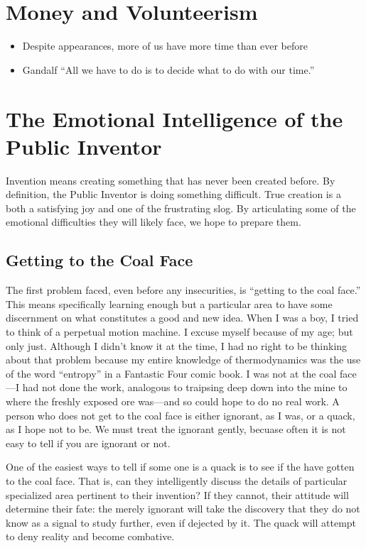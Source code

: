 \documentclass[
	fontsize=10pt, %
	twoside=false, %
	secnumdepth=1, %
]{kaobook}
\begin{document}
\chapter{Money and Volunteerism}

\begin{itemize}
\item Despite appearances, more of us have more time than ever before
  \item Gandalf ``All we have to do is to decide what to do with our time.''
  \end{itemize}

\chapter{The Emotional Intelligence of the Public Inventor}

Invention means creating something that has never been
created before.
By definition, the Public Inventor is doing something
difficult.
True creation is a both a satisfying
joy and one of the frustrating slog.
By articulating some of the emotional difficulties
they will likely face, we hope to prepare them.

\section{Getting to the Coal Face}

The first problem faced, even before any insecurities,
is ``getting to the coal face.''
This means specifically learning enough but a particular
area to have some discernment on what constitutes a good and new idea.
When I was a boy, I tried to think of a perpetual motion machine.
I excuse myself because of my age; but only just.
Although I didn't know it at the time, I had no right to be
thinking about that problem because my entire knowledge of
thermodynamics was the use of the word ``entropy'' in a Fantastic Four comic book.
I was not at the coal face---I had not done the work, analogous to traipsing
deep down into the mine to where the freshly exposed ore was---and so could
hope to do no real work.
A person who does not get to the coal face is either ignorant,
as I was, or a quack, as I hope not to be.
We must treat the ignorant gently, becuase often it is not
easy to tell if you are ignorant or not.

One of the easiest ways to tell if some one is a quack is
to see if the have gotten to the coal face.
That is, can they intelligently discuss the details
of particular specialized area pertinent to their invention?
If they cannot, their attitude will determine their fate:
the merely ignorant will take the discovery that they
do not know as a signal to study further, even if dejected by it.
The quack will attempt to deny reality and become combative.
\end{document}
